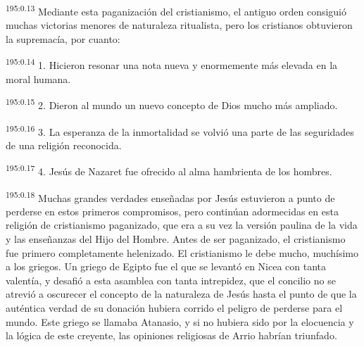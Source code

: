 \par
\textsuperscript{195:0.13} Mediante esta paganización del cristianismo, el antiguo orden consiguió muchas victorias menores de naturaleza ritualista, pero los cristianos obtuvieron la supremacía, por cuanto:

\par
\textsuperscript{195:0.14} 1. Hicieron resonar una nota nueva y enormemente más elevada en la moral humana.

\par
\textsuperscript{195:0.15} 2. Dieron al mundo un nuevo concepto de Dios mucho más ampliado.

\par
\textsuperscript{195:0.16} 3. La esperanza de la inmortalidad se volvió una parte de las seguridades de una religión reconocida.

\par
\textsuperscript{195:0.17} 4. Jesús de Nazaret fue ofrecido al alma hambrienta de los hombres.

\par
\textsuperscript{195:0.18} Muchas grandes verdades enseñadas por Jesús estuvieron a punto de perderse en estos primeros compromisos, pero continúan adormecidas en esta religión de cristianismo paganizado, que era a su vez la versión paulina de la vida y las enseñanzas del Hijo del Hombre. Antes de ser paganizado, el cristianismo fue primero completamente helenizado. El cristianismo le debe mucho, muchísimo a los griegos. Un griego de Egipto fue el que se levantó en Nicea con tanta valentía, y desafió a esta asamblea con tanta intrepidez, que el concilio no se atrevió a oscurecer el concepto de la naturaleza de Jesús hasta el punto de que la auténtica verdad de su donación hubiera corrido el peligro de perderse para el mundo. Este griego se llamaba Atanasio, y si no hubiera sido por la elocuencia y la lógica de este creyente, las opiniones religiosas de Arrio habrían triunfado.


